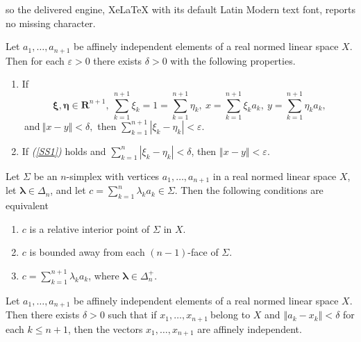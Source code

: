 \documentclass[10pt,a4paper]{amsart}
\begin{document}
so the delivered engine, XeLaTeX with its default Latin Modern text font, reports no missing character.
\begin{lemma}
\label{aug04l1A}Let $a_{1},\ldots,a_{n+1}$ be affinely independent elements of
a real normed linear space $X$. Then for each $\varepsilon>0$ there exists
$\delta>0$ with the following properties.

\begin{enumerate}
\item[\emph{(i)}] If%
\begin{equation}
\ \mathbf{\xi},\mathbf{\eta}\in\mathbf{R}^{n+1},\ \sum_{k=1}^{n+1}\xi
_{k}=1=\sum_{k=1}^{n+1}\eta_{k},\ x=\sum_{k=1}^{n+1}\xi_{k}a_{k}%
,\ y=\sum_{k=1}^{n+1}\eta_{k}a_{k}, \label{SS1}%
\end{equation}
$\ $and$\ \left\Vert x-y\right\Vert <\delta,$ then $\sum_{k=1}^{n+1}\left\vert
\xi_{k}-\eta_{k}\right\vert <\varepsilon$.

\item[\emph{(ii)}] If \emph{(\ref{SS1})} holds and $\sum_{k=1}^{n}\left\vert
\xi_{k}-\eta_{k}\right\vert <\delta$, then $\left\Vert x-y\right\Vert
<\varepsilon$.
\end{enumerate}
\end{lemma}

\begin{proposition}
\label{jul21p3}Let $\Sigma$ be an $n$-simplex with vertices $a_{1}%
,\ldots,a_{n+1}$ in a real normed linear space $X$, let $\mathbf{\lambda}%
\in\Delta_{n}$, and let $c=\sum_{k=1}^{n}\lambda_{k}a_{k}\in\Sigma$. Then the
following conditions are equivalent

\begin{enumerate}
\item[\emph{(i)}] $c$ is a relative interior point of $\Sigma$ in $X.$

\item[\emph{(ii)}] $c$ is bounded away from each $(n-1)$-face of $\Sigma$.

\item[\emph{(iii)}] $c=\sum_{k=1}^{n+1}\lambda_{k}a_{k}$, where
$\mathbf{\lambda}\in\Delta_{n}^{+}$.
\end{enumerate}
\end{proposition}

\begin{corollary}
\label{sept04c1}Let $a_{1},\ldots,a_{n+1}$ be affinely independent elements of
a real normed linear space $X$. Then there exists $\delta>0$ such that if
$x_{1},\ldots,x_{n+1}\ $belong to $X$ and $\left\Vert a_{k}-x_{k}\right\Vert
<\delta$ for each $k\leq n+1$, then the vectors $x_{1},\ldots,x_{n+1}$ are
affinely independent.
\end{corollary}
\end{document}
